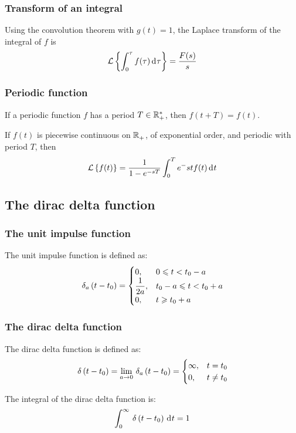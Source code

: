 \documentclass[10pt, twocolumn]{article}
\begin{document}
\subsubsection{Transform of an integral}
Using the convolution theorem with \(g(t) = 1\), the Laplace transform of the integral of \(f\) is
\[
  \mathcal{L}\left\{ \int_0^\tau{f(\tau) \,\mathrm{d}^{} \tau} \right\} = \frac{F(s)}{s}
\]


\subsubsection{Periodic function}
If a periodic function \(f\) has a period \(T \in \mathbb{R}_{+}^{*}\), then \(f(t + T) = f(t)\).

If \(f(t)\) is piecewise continuous on \(\mathbb{R}_{+}^{}\), of exponential order, and periodic with period \(T\), then
\[
  \mathcal{L}\left\{ f(t) \right\} = \frac{1}{1 - e^{-sT}} \int_0^T{e^-st f(t) \,\mathrm{d}^{} t}
\]


\subsection{The dirac delta function}
\subsubsection{The unit impulse function}
The unit impulse function is defined as:
\[
  \,\delta_{a}\left( t - t_0 \right) = \begin{cases}
    0,             & 0 \leqslant t < t_0 - a       \\
    \dfrac{1}{2a}, & t_0 - a \leqslant t < t_0 + a \\
    0,             & t \geqslant t_0 + a
  \end{cases}
\]


\subsubsection{The dirac delta function}
The dirac delta function is defined as:
\[
  \,\delta_{}\left( t - t_0 \right) = \lim_{a \to 0}{\,\delta_{a}\left( t - t_0 \right)} =
  \begin{cases}
    \infty, & t = t_0    \\
    0,      & t \neq t_0
  \end{cases}
\]

\begin{remark}
  The integral of the dirac delta function is:
  \[
    \int_0^\infty{\,\delta_{}\left( t - t_0 \right) \,\mathrm{d}^{} t} = 1
  \]
\end{remark}
\end{document}

